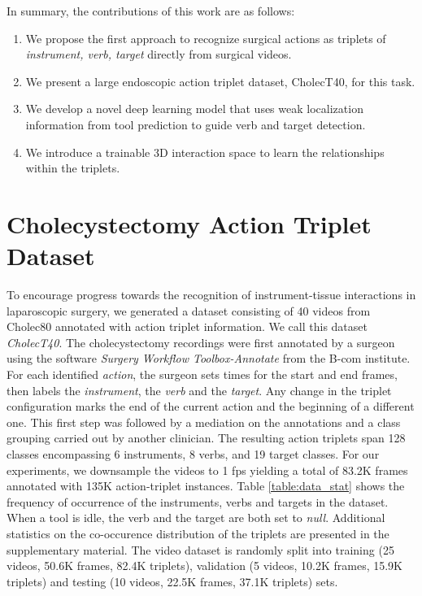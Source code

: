 \documentclass[english,runningheads,a4paper]{llncs}
\begin{document}
In summary, the contributions of this work are as follows:
\begin{enumerate}
    \item We propose the first approach to recognize surgical actions as triplets of \textit{\textlangle{}instrument, verb, target\textrangle{}} directly from surgical videos.
    \item We present a large endoscopic action triplet dataset, CholecT40, for this task.
    \item We develop a novel deep learning model that uses weak localization information from tool prediction to guide  verb and target detection.
    \item We introduce a trainable 3D interaction space to learn the relationships within the triplets.
\end{enumerate}
 \section{Cholecystectomy Action Triplet Dataset} \label{sec:dataset}
To encourage progress towards the recognition of instrument-tissue interactions in laparoscopic surgery, we generated a dataset consisting of 40 videos from Cholec80 \cite{twinanda_endonet_ieee2017} annotated with action triplet information. We call this dataset \textit{CholecT40}. 
The cholecystectomy recordings were first annotated by a surgeon using the software \textit{Surgery Workflow Toolbox-Annotate} from the B-com institute.
For each identified \textit{action}, the surgeon sets times for the start and end frames, then labels the \textit{instrument}, the \textit{verb} and the \textit{target}. 
Any change in the triplet configuration marks the end of the current action and the beginning of a different one. 
This first step was followed by a mediation on the annotations and a class grouping carried out by another clinician.
The resulting action triplets span 128 classes encompassing 6 instruments, 8 verbs, and 19 target classes. For our experiments, we downsample the videos to 1 fps yielding a total of 83.2K frames annotated with 135K action-triplet instances. 
Table \ref{table:data_stat} shows the frequency of occurrence of the instruments, verbs and targets in the dataset. When a tool is idle, the verb and the target are both set to {\it null}.
Additional statistics on the co-occurence distribution of the triplets are presented in the supplementary material.
The video dataset is randomly split into training (25 videos, 50.6K frames, 82.4K triplets),  validation (5 videos, 10.2K frames, 15.9K triplets) and testing (10 videos, 22.5K frames, 37.1K triplets) sets.
\end{document}
